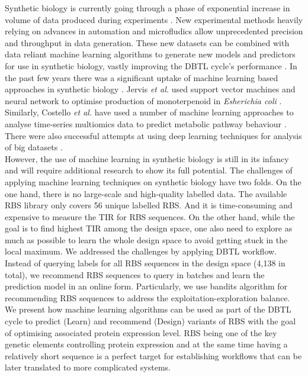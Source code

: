 \documentclass{article}
\begin{document}
Synthetic biology is currently going through a phase of exponential increase in volume of data produced during experiments \cite{Freemont2019}. 
New experimental methods heavily relying on advances in automation and microfludics allow unprecedented precision and throughput in data generation.
These new datasets can be combined with data reliant machine learning algorithms to generate new models and predictors for use in synthetic biology, vastly improving the DBTL cycle's performance \cite{Camacho2018,Radivojevic2020}. 
In the past few years there was a significant uptake of machine learning based approaches in synthetic biology \cite{LAWSON2021}.
Jervis \emph{et al.} used support vector machines and neural network to optimise production of monoterpenoid in \emph{Esherichia coli} \cite{Jervis2019}.
Similarly, Costello \emph{et al.} have used a number of machine learning approaches to analyse time-series multiomics data to predict metabolic pathway behaviour \cite{Costello2018}.
There were also successful attempts at using deep learning techniques for analysis of big datasets \cite{Alipanahi2015,Angermueller2016}.\\
However, the use of machine learning in synthetic biology is still in its infancy and will require additional research to show its full potential. 
The challenges of applying machine learning techniques on synthetic biology have two folds.
On the one hand, there is no large-scale and high-quality labelled data. 
The available RBS library \cite{jervis2018machine} only covers 56 unique labelled RBS.
And it is time-consuming and expensive to measure the TIR for RBS sequences. 
On the other hand,  while the goal is to find highest TIR among the design space, one also need to explore as much as possible to learn the whole design space to avoid getting stuck in the local maximum.  
We addressed the challenges by applying DBTL workflow. 
Instead of querying labels for all RBS sequences in the design space (4,138 in total), we recommend RBS sequences to query in batches and learn the prediction model in an online form.
Particularly, we use bandits algorithm for recommending RBS sequences to address the exploitation-exploration balance. \\
We present how machine learning algorithms can be used as part of the DBTL cycle to predict (Learn) and recommend (Design) variants of RBS with the goal of optimising associated protein expression level. 
RBS being one of the key genetic elements controlling protein expression and at the same time having a relatively short sequence is a perfect target for establishing workflows that can be later translated to more complicated systems.
\end{document}
